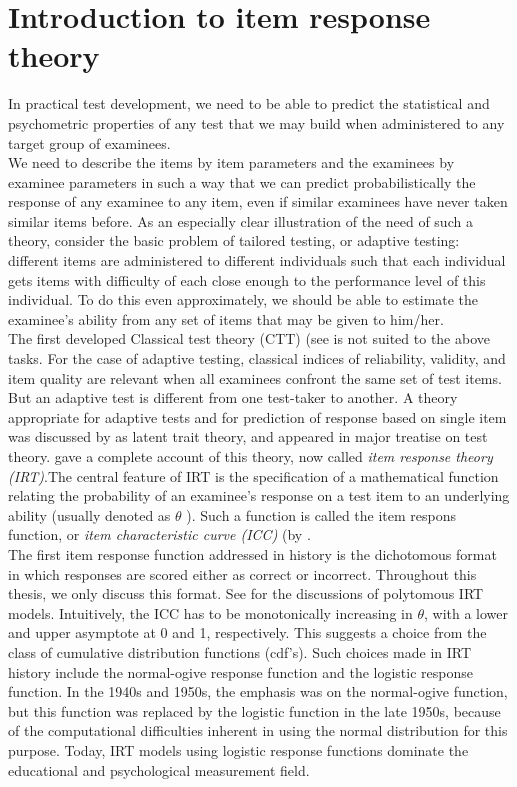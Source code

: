 \section{Introduction to item response theory}
 In practical test development, we need to be able to predict the statistical and psychometric properties of any test that we may build when administered to any target group of examinees.\\
 We need to describe the items by item parameters and the examinees by examinee parameters in such a way that we can predict probabilistically the response of any examinee to any item, even if similar examinees have never taken similar items before. As an especially clear illustration of the need of such a theory, consider the basic problem of tailored testing, or adaptive testing: different items are administered to different individuals such that each individual gets items with difficulty of each close enough to the performance level of this individual. To do this even approximately, we should be able to estimate the examinee’s ability from any set of items that may be given to him/her.\\ 
The first developed Classical test theory (CTT) (see \cite{abookonCTT} is not suited to the above tasks. For the case of adaptive testing, classical indices of reliability, validity, and item quality are relevant when all examinees confront the same set of test items. But an adaptive test is different from one test-taker to another. A theory appropriate for adaptive tests and for prediction of response based on single item was discussed by \cite{Birnbaum1958} as latent trait theory, and appeared in \cite{Lord1968} major treatise on test theory. \cite{Lord1980} gave a complete account of this theory, now called \emph{item response theory (IRT)}.The central feature of IRT is the specification of a mathe­matical function relating the probability of an examinee’s response on a test item to an underlying ability (usually denoted as $\theta$ ). Such a function is called the item respons function, or \emph{item characteristic curve (ICC)} (by \cite{tucker1946}.\\
The first item response function addressed in history is the dichotomous format in which responses are scored either as correct or incorrect. Throughout this thesis, we only discuss this format. See \cite{vdlhambleton1997} for the discussions of polytomous IRT models. Intuitively, the ICC has to be monotonically increasing in $\theta$, with a lower and upper asymptote at 0 and 1, respectively. This suggests a choice from the class of cumulative distribution functions (cdf’s). Such choices made in IRT history include the normal-ogive response function and the logistic response function. In the 1940s and 1950s, the emphasis was on the normal-ogive function, but this function was replaced by the logistic function in the late 1950s, because of the computational difficulties inherent in using the normal distribution for this purpose. Today, IRT models using logistic response functions dominate the educational and psychological measurement field.\\
